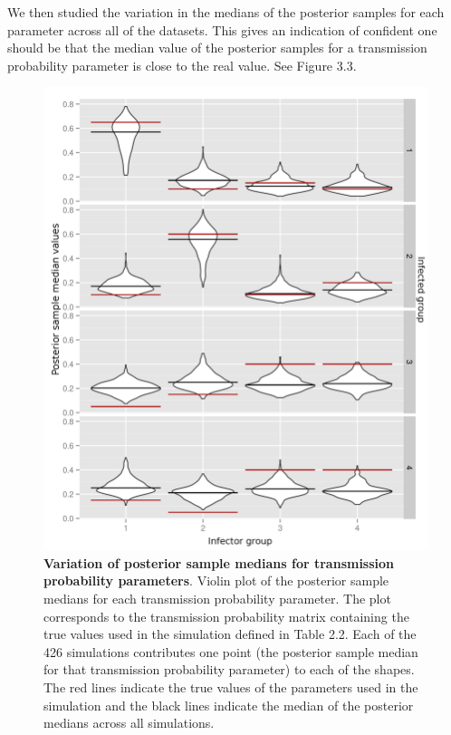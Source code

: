 \documentclass[11pt,a4paper]{report}
\begin{document}
We then studied the variation in the medians of the posterior samples for each parameter across all of the datasets. This gives an indication of confident one should be that the median value of the posterior samples for a transmission probability parameter is close to the real value. See Figure 3.3.
\begin{figure}[h!]
\centering
\includegraphics[scale=0.6]{violinmat.png} \newline
\caption{{\bf Variation of posterior sample medians for transmission probability parameters}. Violin plot of the posterior sample medians for each transmission probability parameter. The plot corresponds to the transmission probability matrix containing the true values used in the simulation defined in Table 2.2. Each of the 426 simulations contributes one point (the posterior sample median for that transmission probability parameter) to each of the shapes. The red lines indicate the true values of the parameters used in the simulation and the black lines indicate the median of the posterior medians across all simulations.}
\end{figure}
\end{document}
